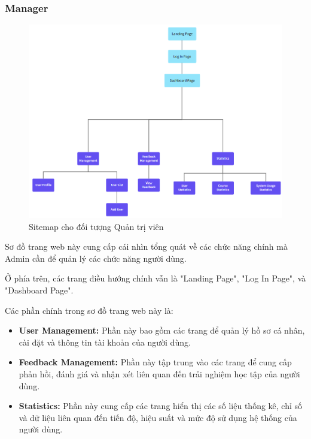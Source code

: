 \subsubsection{Manager}
\begin{figure}[H]
    \centering
    \includegraphics[scale=0.55]{Images/sitemap/Manager.png}
    \caption{Sitemap cho đối tượng Quản trị viên}
    \label{fig:enter-label}
\end{figure}
\par Sơ đồ trang web này cung cấp cái nhìn tổng quát về các chức năng chính mà Admin cần để quản lý các chức năng người dùng.

\par Ở phía trên, các trang điều hướng chính vẫn là "Landing Page", "Log In Page", và "Dashboard Page".

\par Các phần chính trong sơ đồ trang web này là:

\begin{itemize}
    \item \textbf{User Management:} Phần này bao gồm các trang để quản lý hồ sơ cá nhân, cài đặt và thông tin tài khoản của người dùng.
    \item \textbf{Feedback Management:} Phần này tập trung vào các trang để cung cấp phản hồi, đánh giá và nhận xét liên quan đến trải nghiệm học tập của người dùng.
    \item \textbf{Statistics:} Phần này cung cấp các trang hiển thị các số liệu thống kê, chỉ số và dữ liệu liên quan đến tiến độ, hiệu suất và mức độ sử dụng hệ thống của người dùng.
\end{itemize}

